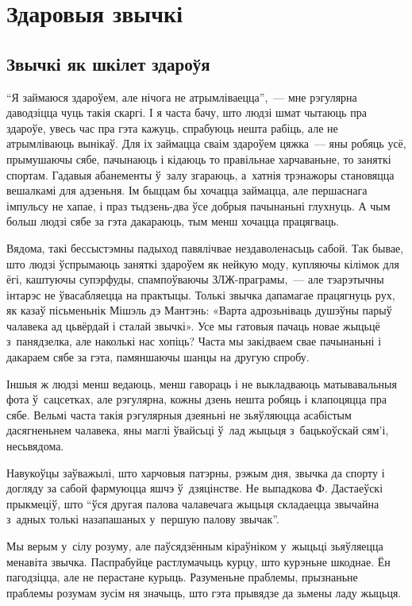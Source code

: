 \chapter{Здаровыя звычкі}

\section{Звычкі як шкілет здароўя}

``Я займаюся здароўем, але нічога не атрымліваецца'',~--- мне рэгулярна даводзіцца чуць такія скаргі. І я часта бачу, што людзі шмат чытаюць пра здароўе, увесь час пра гэта кажуць, спрабуюць нешта рабіць, але не атрымліваюць вынікаў. Для іх займацца сваім здароўем цяжка~--- яны робяць усё, прымушаючы сябе, пачынаюць і кідаюць то правільнае харчаваньне, то заняткі спортам. Гадавыя абанементы ў~залу згараюць, а~хатнія трэнажоры становяцца вешалкамі для адзеньня. Ім быццам бы хочацца займацца, але першаснага імпульсу не хапае, і праз тыдзень-два ўсе добрыя пачынаньні глухнуць. А чым больш людзі сябе за гэта дакараюць, тым менш хочацца працягваць.

Вядома, такі бессыстэмны падыход павялічвае нездаволенасьць сабой. Так бывае, што людзі ўспрымаюць заняткі здароўем як нейкую моду, купляючы кілімок для ёгі, каштуючы супэрфуды, спампоўваючы ЗЛЖ-праграмы,~--- але тэарэтычны інтарэс не ўвасабляецца на практыцы. Толькі звычка дапамагае працягнуць рух, як казаў пісьменьнік Мішэль дэ Мантэнь: «Варта адрозьніваць душэўны парыў чалавека ад цьвёрдай і сталай звычкі». Усе мы гатовыя пачаць новае жыцьцё з~панядзелка, але наколькі нас хопіць? Часта мы закідваем свае пачынаньні і дакараем сябе за гэта, памяншаючы шанцы на другую спробу.

Іншыя ж людзі менш ведаюць, менш гавораць і не выкладваюць матывавальныя фота ў~сацсетках, але рэгулярна, кожны дзень нешта робяць і клапоцяцца пра сябе. Вельмі часта такія рэгулярныя дзеяньні не зьяўляюцца асабістым дасягненьнем чалавека, яны маглі ўвайсьці ў~лад жыцьця з~бацькоўскай сям'і, несьвядома.

Навукоўцы заўважылі, што харчовыя патэрны, рэжым дня, звычка да спорту і догляду за сабой фармуюцца яшчэ ў~дзяцінстве. Не выпадкова Ф. Дастаеўскі прыкмеціў, што ``ўся другая палова чалавечага жыцьця складаецца звычайна з~адных толькі назапашаных у~першую палову звычак''.

Мы верым у~сілу розуму, але паўсядзённым кіраўніком у~жыцьці зьяўляецца менавіта звычка. Паспрабуйце растлумачыць курцу, што курэньне шкоднае. Ён пагодзіцца, але не перастане курыць. Разуменьне праблемы, прызнаньне праблемы розумам зусім ня значыць, што гэта прывядзе да зьмены ладу жыцьця.

